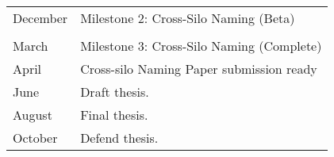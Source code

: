 \begin{table}[htbp]
\begin{tabular}{p{}p{}}
    December       & Milestone 2: Cross-Silo Naming (Beta)                      \\
    \rowcolor[HTML]{C0C0C0} \multicolumn{2}{c}{2024}                            \\
    March          & Milestone 3: Cross-Silo Naming (Complete)                  \\
    April          & Cross-silo Naming Paper submission ready                   \\
    June           & Draft thesis.                                              \\
    August         & Final thesis.                                              \\
    October        & Defend thesis.                                             \\
  \end{tabular}%
  \label{ch:plan:tab:schedule}%
\end{table}%
